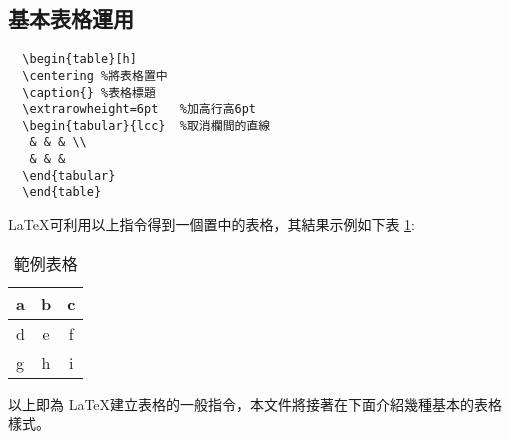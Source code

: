 \subsection{基本表格運用}
\bigskip
\begin{lstlisting}
  \begin{table}[h] 
  \centering %將表格置中
  \caption{} %表格標題
  \extrarowheight=6pt   %加高行高6pt
  \begin{tabular}{lcc}  %取消欄間的直線
   & & & \\
   & & &
  \end{tabular}
  \end{table}
\end{lstlisting}

\LaTeX 可利用以上指令得到一個置中的表格，其結果示例如下表 \ref{tb:basic_11}:
\begin{table}[h] 
  \centering
  \caption{範例表格}\label{tb:basic_11}
  \extrarowheight=6pt   %
  \begin{tabular}{lcc}  %
  \hline
   a & b & c  \\\hline
   d & e & f  \\
   g & h & i  \\\hline
  \end{tabular}
\end{table}

以上即為 \LaTeX 建立表格的一般指令，本文件將接著在下面介紹幾種基本的表格樣式。

\newpage

